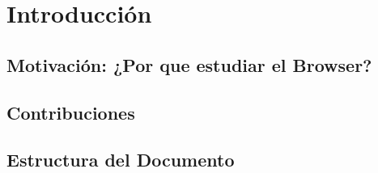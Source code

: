 \chapter{Introducción}
\label{chap:intro}


\section{Motivación: ¿Por que estudiar el Browser?}
\label{chap:intro.1}


\section{Contribuciones}
\label{chap:intro.2}

\section{Estructura del Documento}
\label{chap:intro.3}

